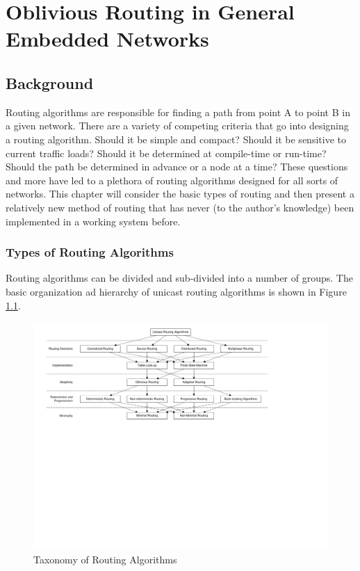 \chapter{Oblivious Routing in General Embedded Networks}\label{sec:routing}

\section{Background}\label{sec:routing:background}

Routing algorithms are responsible for finding a path from point A to point B in a given network. There are a variety of competing criteria that go into designing a routing algorithm. Should it be simple and compact? Should it be sensitive to current traffic loads? Should it be determined at compile-time or run-time? Should the path be determined in advance or a node at a time? These questions and more have led to a plethora of routing algorithms designed for all sorts of networks. This chapter will consider the basic types of routing and then present a relatively new method of routing that has never (to the author's knowledge) been implemented in a working system before.

\subsection{Types of Routing Algorithms}\label{sec:routing:background:comparison_routing_algorithms}

Routing algorithms can be divided and sub-divided into a number of groups. The basic organization ad hierarchy of unicast routing algorithms is shown in Figure \ref{fig:routing:taxonomy}.

\begin{landscape}
	\begin{figure}[p]
		\begin{centering}
			\includegraphics{Routing/Figures/routing-taxonomy.pdf}
			\caption[Taxonomy of Routing Algorithms]{Taxonomy of Routing Algorithms \cite{ref:1997-duato-interconnection_networks}}
			\label{fig:routing:taxonomy}
		\end{centering}
	\end{figure}
\end{landscape}

